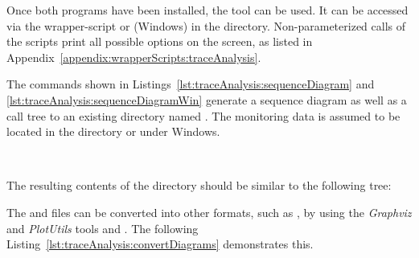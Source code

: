 \vspace{3mm}

\noindent Once both programs have been installed, the \KiekerTraceAnalysis{} tool can be used. It can be accessed via the wrapper-script  or  (Windows) in the  directory. Non-parameterized calls of the scripts print all possible options on the screen, as listed in Appendix~\ref{appendix:wrapperScripts:traceAnalysis}.

The commands shown in Listings~\ref{lst:traceAnalysis:sequenceDiagram} and \ref{lst:traceAnalysis:sequenceDiagramWin} generate a sequence diagram as well as a call tree to an existing directory named . The monitoring data is assumed to be located in the directory  or  under Windows. %

\setBashListing



\


\pagebreak

The resulting contents of the  directory should be similar to %
the following tree:

\begin{figure}[H]
\begin{graybox}
\end{graybox}
\end{figure}

\noindent The  and  files can be converted into other formats, %
such as , by using the \textit{Graphviz} and \textit{PlotUtils} tools %
 and . %
The following Listing~\ref{lst:traceAnalysis:convertDiagrams} demonstrates this. %




%

